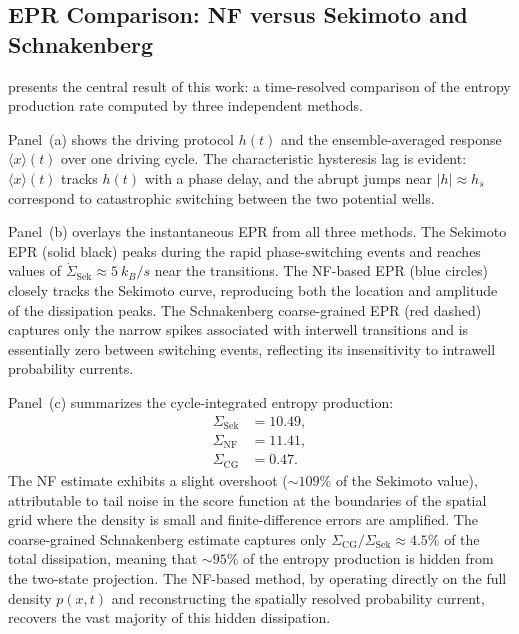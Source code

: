\subsection{EPR Comparison: NF versus Sekimoto and Schnakenberg}
\label{sec:results_epr}

 presents the central result of this work: a time-resolved comparison of the entropy production rate computed by three independent methods.

Panel~(a) shows the driving protocol $h(t)$ and the ensemble-averaged response $\langle x\rangle(t)$ over one driving cycle.
The characteristic hysteresis lag is evident: $\langle x\rangle(t)$ tracks $h(t)$ with a phase delay, and the abrupt jumps near $|h| \approx h_s$ correspond to catastrophic switching between the two potential wells.

Panel~(b) overlays the instantaneous EPR from all three methods.
The Sekimoto EPR (solid black) peaks during the rapid phase-switching events and reaches values of $\dot{\Sigma}_{\mathrm{Sek}} \approx \SI{5}{k_B/s}$ near the transitions.
The NF-based EPR (blue circles) closely tracks the Sekimoto curve, reproducing both the location and amplitude of the dissipation peaks.
The Schnakenberg coarse-grained EPR (red dashed) captures only the narrow spikes associated with interwell transitions and is essentially zero between switching events, reflecting its insensitivity to intrawell probability currents.

Panel~(c) summarizes the cycle-integrated entropy production:
\begin{align}
    \Sigma_{\mathrm{Sek}}  &= \num{10.49}, \label{eq:sigma_sek_value} \\
    \Sigma_{\mathrm{NF}}   &= \num{11.41}, \label{eq:sigma_nf_value} \\
    \Sigma_{\mathrm{CG}}   &= \num{0.47}.  \label{eq:sigma_cg_value}
\end{align}
The NF estimate exhibits a slight overshoot ($\sim\!\num{109}\%$ of the Sekimoto value), attributable to tail noise in the score function at the boundaries of the spatial grid where the density is small and finite-difference errors are amplified.
The coarse-grained Schnakenberg estimate captures only $\Sigma_{\mathrm{CG}}/\Sigma_{\mathrm{Sek}} \approx \num{4.5}\%$ of the total dissipation, meaning that $\sim\!\num{95}\%$ of the entropy production is hidden from the two-state projection.
The NF-based method, by operating directly on the full density $p(x,t)$ and reconstructing the spatially resolved probability current, recovers the vast majority of this hidden dissipation.

